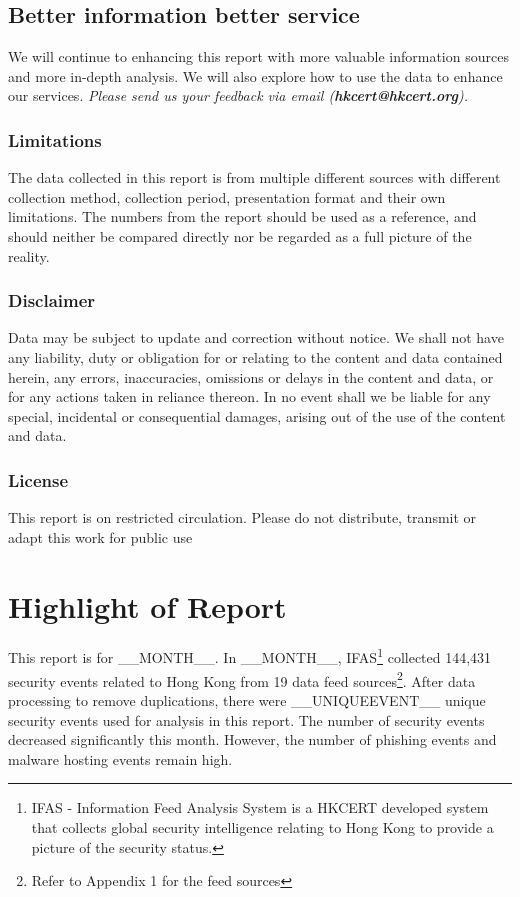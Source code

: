 \documentclass[11pt]{article}
\begin{document}
\subsection*{Better information better service}

We will continue to enhancing this report with more valuable information sources and more in-depth analysis. We will also explore how to use the data to enhance our services. \textit{Please send us your feedback via email (\textbf{hkcert@hkcert.org}).}

\subsubsection*{Limitations}
The data collected in this report is from multiple different sources with different collection method, collection period, presentation format and their own limitations. The numbers from the report should be used as a reference, and should neither be compared directly nor be regarded as a full picture of the reality. 

\subsubsection*{Disclaimer}
Data may be subject to update and correction without notice. We shall not have any liability, duty or obligation for or relating to the content and data contained herein, any errors, inaccuracies, omissions or delays in the content and data, or for any actions taken in reliance thereon.  In no event shall we be liable for any special, incidental or consequential damages, arising out of the use of the content and data.

\subsubsection*{License}
This report is on restricted circulation. Please do not distribute, transmit or adapt this work for public use

\newpage
\tableofcontents

\newpage
{}
\section*{Highlight of Report}
This report is for __MONTH__.
In __MONTH__, IFAS\footnote{IFAS - Information Feed Analysis System is a HKCERT developed system that collects global security intelligence relating to Hong Kong to provide a picture of the security status.} collected 144,431 security events related to Hong Kong from 19 data feed sources\footnote{Refer to Appendix 1 for the feed sources}. After data processing to remove duplications, there were __UNIQUEEVENT__ unique security events used for analysis in this report.
The number of security events decreased significantly this month. However, the number of phishing events and malware hosting events remain high.
\end{document}
